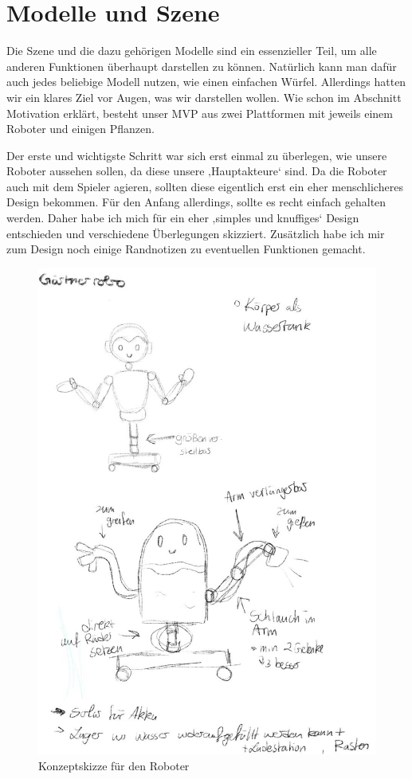 \section{Modelle und Szene}

Die Szene und die dazu gehörigen Modelle sind ein essenzieller Teil, um alle anderen Funktionen überhaupt darstellen zu können. Natürlich kann man dafür auch jedes beliebige Modell nutzen, wie einen einfachen Würfel. Allerdings hatten wir ein klares Ziel vor Augen, was wir darstellen wollen. Wie schon im Abschnitt Motivation erklärt, besteht unser MVP aus zwei Plattformen mit jeweils einem Roboter und einigen Pflanzen.
\par
Der erste und wichtigste Schritt war sich erst einmal zu überlegen, wie unsere Roboter aussehen sollen, da diese unsere ‚Hauptakteure‘ sind. Da die Roboter auch mit dem Spieler agieren, sollten diese eigentlich erst ein eher menschlicheres Design bekommen. Für den Anfang allerdings, sollte es recht einfach gehalten werden. Daher habe ich mich für ein eher ‚simples und knuffiges‘ Design entschieden und verschiedene Überlegungen skizziert. Zusätzlich habe ich mir zum Design noch einige Randnotizen zu eventuellen Funktionen gemacht. 
\begin{figure}[h]
	\centering
	\includegraphics[height=0.3\pageheight,keepaspectratio]{pics/1} 
	\caption{Konzeptskizze für den Roboter}
\end{figure}
